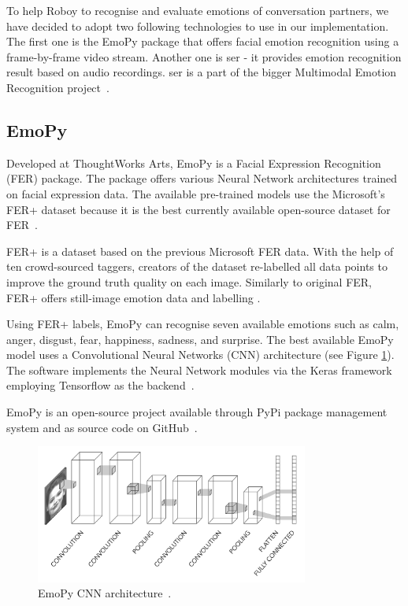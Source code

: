To help Roboy to recognise and evaluate emotions of conversation partners, we have decided to adopt two following technologies to use in our implementation. The first one is the EmoPy package that offers facial emotion recognition using a frame-by-frame video stream. Another one is \acrfull{ser} - it provides emotion recognition result based on audio recordings. \acrshort{ser} is a part of the bigger Multimodal Emotion Recognition project~\parencite{maelmer}.

\subsection{EmoPy}

Developed at ThoughtWorks Arts, EmoPy is a Facial Expression Recognition (FER) package. The package offers various Neural Network architectures trained on facial expression data. The available pre-trained models use the Microsoft’s FER+ dataset because it is the best currently available open-source dataset for FER~\parencite{emopy}.

FER+ is a dataset based on the previous Microsoft FER data. With the help of ten crowd-sourced taggers, creators of the dataset re-labelled all data points to improve the ground truth quality on each image. Similarly to original FER, FER+ offers still-image emotion data and labelling \parencite{BarsoumICMI2016}.

Using FER+ labels, EmoPy can recognise seven available emotions such as calm, anger, disgust, fear, happiness, sadness, and surprise. The best available EmoPy model uses a Convolutional Neural Networks (CNN) architecture (see Figure \ref{fig:emopy}). The software implements the Neural Network modules via the Keras framework employing Tensorflow as the backend~\parencite{emopygh}.

EmoPy is an open-source project available through PyPi package management system and as source code on GitHub~\parencite{emopygh}.

\begin{figure}[htpb]
  \centering
  \includegraphics[width=0.8\textwidth]{figures/emopy.png}
  \caption{EmoPy CNN architecture~\parencite{emopygh}.} \label{fig:emopy}
\end{figure}

